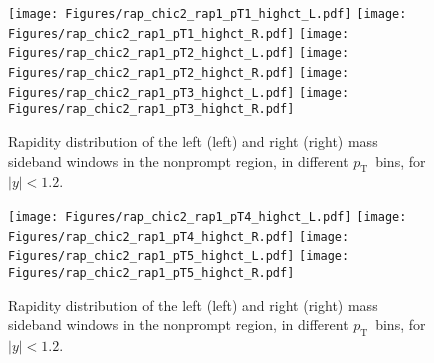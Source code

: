\documentclass[12pt]{article}
\newcommand{\pt}{$p_{\mathrm{T}}$}
\begin{document}
\begin{figure}[htbp]
\centering
\texttt{[image: Figures/rap\_chic2\_rap1\_pT1\_highct\_L.pdf]}
\texttt{[image: Figures/rap\_chic2\_rap1\_pT1\_highct\_R.pdf]}
\texttt{[image: Figures/rap\_chic2\_rap1\_pT2\_highct\_L.pdf]}
\texttt{[image: Figures/rap\_chic2\_rap1\_pT2\_highct\_R.pdf]}
\texttt{[image: Figures/rap\_chic2\_rap1\_pT3\_highct\_L.pdf]}
\texttt{[image: Figures/rap\_chic2\_rap1\_pT3\_highct\_R.pdf]}
\caption{Rapidity distribution of the left (left) and
  right (right) mass sideband windows in the nonprompt region, in
  different
  \pt\ bins, for $|y| < 1.2$.}
\end{figure}
\clearpage

\begin{figure}[htbp]
\centering
\texttt{[image: Figures/rap\_chic2\_rap1\_pT4\_highct\_L.pdf]}
\texttt{[image: Figures/rap\_chic2\_rap1\_pT4\_highct\_R.pdf]}
\texttt{[image: Figures/rap\_chic2\_rap1\_pT5\_highct\_L.pdf]}
\texttt{[image: Figures/rap\_chic2\_rap1\_pT5\_highct\_R.pdf]}
\caption{Rapidity distribution of the left (left) and
  right (right) mass sideband windows in the nonprompt region, in
  different
  \pt\ bins, for $|y| < 1.2$.}
\end{figure}
\clearpage
\end{document}
